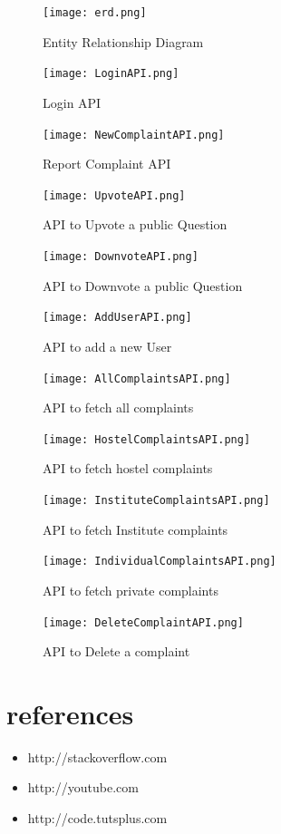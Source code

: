 \documentclass[12pt]{article}
\begin{document}
\begin{figure}[!ht]
	\centering
	\texttt{[image: erd.png]}
	\caption{Entity Relationship Diagram}
\end{figure}

\begin{figure}[!ht]
	\centering
	\texttt{[image: LoginAPI.png]}
	\caption{Login API}
\end{figure}

\begin{figure}[!ht]
	\centering
	\texttt{[image: NewComplaintAPI.png]}
	\caption{Report Complaint API}
\end{figure}

\begin{figure}[!ht]
	\centering
	\texttt{[image: UpvoteAPI.png]}
	\caption{API to Upvote a public Question}
\end{figure}

\begin{figure}[!ht]
	\centering
	\texttt{[image: DownvoteAPI.png]}
	\caption{API to Downvote a public Question}
\end{figure}

\begin{figure}[!ht]
	\centering
	\texttt{[image: AddUserAPI.png]}
	\caption{API to add a new User}
\end{figure}

\begin{figure}[!ht]
	\centering
	\texttt{[image: AllComplaintsAPI.png]}
	\caption{API to fetch all complaints}
\end{figure}

\begin{figure}[!ht]
	\centering
	\texttt{[image: HostelComplaintsAPI.png]}
	\caption{API to fetch hostel complaints}
\end{figure}

\begin{figure}[!ht]
	\centering
	\texttt{[image: InstituteComplaintsAPI.png]}
	\caption{API to fetch Institute complaints}
\end{figure}

\begin{figure}[!ht]
	\centering
	\texttt{[image: IndividualComplaintsAPI.png]}
	\caption{API to fetch private complaints}
\end{figure}

\begin{figure}[!ht]
	\centering
	\texttt{[image: DeleteComplaintAPI.png]}
	\caption{API to Delete a complaint}
\end{figure}








\section{references}
\begin{itemize}
    \item http://stackoverflow.com
    \item http://youtube.com
    \item http://code.tutsplus.com
\end{itemize}
\end{document}
